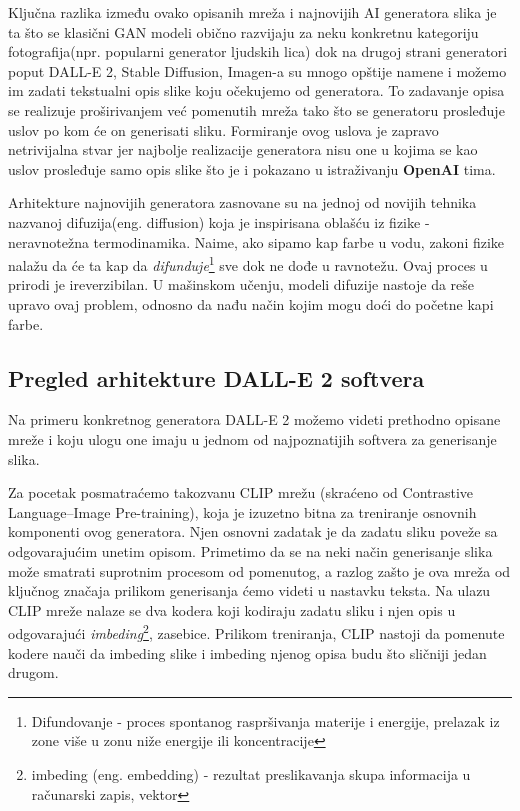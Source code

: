 \documentclass[12pt, letterpaper]{article}
\begin{document}
Ključna razlika između ovako opisanih mreža i najnovijih AI generatora slika je ta što se klasični GAN modeli obično razvijaju za neku konkretnu kategoriju fotografija(npr. popularni generator ljudskih lica)\cite{gen1} dok na drugoj strani generatori poput DALL-E 2, Stable Diffusion, Imagen-a su mnogo opštije namene i možemo im zadati tekstualni opis slike koju očekujemo od generatora. To zadavanje opisa se realizuje proširivanjem već pomenutih mreža tako što se generatoru prosleđuje uslov po kom će on generisati sliku.\cite{openai_dali, openai_glide, asembli} 
Formiranje ovog uslova je zapravo netrivijalna stvar jer najbolje realizacije generatora nisu one u kojima se kao uslov prosleđuje samo opis slike što je i pokazano u istraživanju \textbf{OpenAI} tima.\cite{openai_dali}

Arhitekture najnovijih generatora zasnovane su na jednoj od novijih tehnika nazvanoj difuzija(eng. diffusion) koja je inspirisana oblašću iz fizike - neravnotežna termodinamika. Naime, ako sipamo kap farbe u vodu, zakoni fizike nalažu da će ta kap da \textit{difunduje}\footnote{Difundovanje - proces spontanog raspršivanja materije i energije, prelazak iz zone više u zonu niže energije ili koncentracije} sve dok ne dođe u ravnotežu. Ovaj proces u prirodi je ireverzibilan. U mašinskom učenju, modeli difuzije nastoje da reše upravo ovaj problem, odnosno da nađu način kojim mogu doći do početne kapi farbe.\cite{asembli}

\subsection{Pregled arhitekture DALL-E 2 softvera}

Na primeru konkretnog generatora DALL-E 2 možemo videti prethodno opisane mreže i koju ulogu one imaju u jednom od najpoznatijih softvera za generisanje slika.

Za pocetak posmatraćemo takozvanu CLIP mrežu (skraćeno od Contrastive Language–Image Pre-training), koja je izuzetno bitna za treniranje osnovnih komponenti ovog generatora. Njen osnovni zadatak je da zadatu sliku poveže sa odgovarajućim unetim opisom. Primetimo da se na neki način generisanje slika može smatrati suprotnim procesom od pomenutog, a razlog zašto je ova mreža od ključnog značaja prilikom generisanja ćemo videti u nastavku teksta. Na ulazu CLIP mreže nalaze se dva kodera koji kodiraju zadatu sliku i njen opis u odgovarajući \textit{imbeding}\footnote{imbeding (eng. embedding) - rezultat preslikavanja skupa informacija u računarski zapis, vektor}, zasebice. Prilikom treniranja, CLIP nastoji da pomenute kodere nauči da imbeding slike i imbeding njenog opisa budu što sličniji jedan drugom.\cite{clip, openai_dali}
\end{document}
